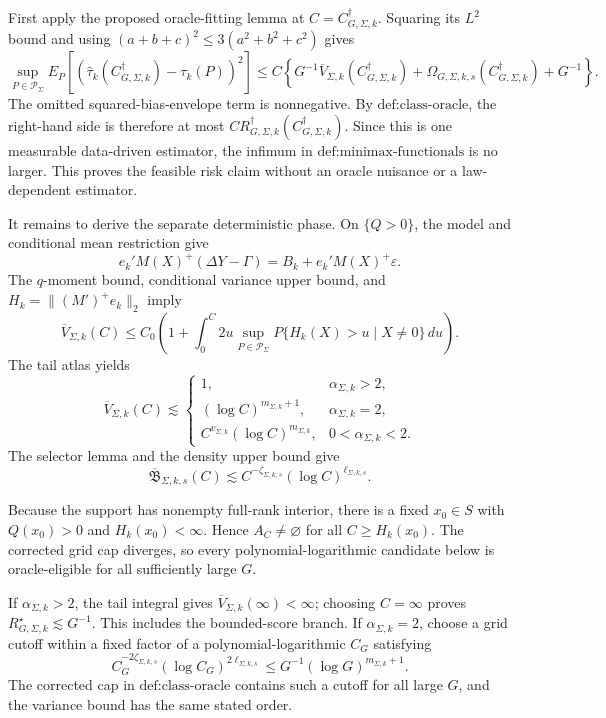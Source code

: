 First apply the proposed oracle-fitting lemma at \(C=C_{G,\Sigma,k}^{\dagger}\). Squaring its \(L^2\) bound and using \((a+b+c)^2\le3(a^2+b^2+c^2)\) gives
\[
\sup_{P\in\mathcal P_\Sigma}E_P[(\widehat\tau_k(C_{G,\Sigma,k}^{\dagger})-\tau_k(P))^2]
\le C\left\{G^{-1}\overline V_{\Sigma,k}(C_{G,\Sigma,k}^{\dagger})
+\Omega_{G,\Sigma,k,s}(C_{G,\Sigma,k}^{\dagger})+G^{-1}\right\}.
\]
The omitted squared-bias-envelope term is nonnegative. By \(\text{def:class-oracle}\), the right-hand side is therefore at most \(C R_{G,\Sigma,k}^{\dagger}(C_{G,\Sigma,k}^{\dagger})\). Since this is one measurable data-driven estimator, the infimum in \(\text{def:minimax-functionals}\) is no larger. This proves the feasible risk claim without an oracle nuisance or a law-dependent estimator.

It remains to derive the separate deterministic phase. On \(\{Q>0\}\), the model and conditional mean restriction give
\[
e_k'M(X)^+(\Delta Y-\Gamma)=B_k+e_k'M(X)^+\varepsilon.
\]
The \(q\)-moment bound, conditional variance upper bound, and \(H_k=\|(M')^+e_k\|_2\) imply
\[
\overline V_{\Sigma,k}(C)
\le C_0\left(1+\int_0^C2u\sup_{P\in\mathcal P_\Sigma}P\{H_k(X)>u\mid X\ne0\}\,du\right).
\]
The tail atlas yields
\[
\overline V_{\Sigma,k}(C)\lesssim
\begin{cases}
1,&\alpha_{\Sigma,k}>2,\\
(\log C)^{m_{\Sigma,k}+1},&\alpha_{\Sigma,k}=2,\\
C^{v_{\Sigma,k}}(\log C)^{m_{\Sigma,k}},&0<\alpha_{\Sigma,k}<2.
\end{cases}
\]
The selector lemma and the density upper bound give
\[
\overline{\mathfrak B}_{\Sigma,k,s}(C)
\lesssim C^{-\zeta_{\Sigma,k,s}}(\log C)^{\ell_{\Sigma,k,s}}.
\]

Because the support has nonempty full-rank interior, there is a fixed \(x_0\in S\) with \(Q(x_0)>0\) and \(H_k(x_0)<\infty\). Hence \(A_C\ne\varnothing\) for all \(C\ge H_k(x_0)\). The corrected grid cap diverges, so every polynomial-logarithmic candidate below is oracle-eligible for all sufficiently large \(G\).

If \(\alpha_{\Sigma,k}>2\), the tail integral gives \(\overline V_{\Sigma,k}(\infty)<\infty\); choosing \(C=\infty\) proves \(R_{G,\Sigma,k}^{\star}\lesssim G^{-1}\). This includes the bounded-score branch. If \(\alpha_{\Sigma,k}=2\), choose a grid cutoff within a fixed factor of a polynomial-logarithmic \(C_G\) satisfying
\[
C_G^{-2\zeta_{\Sigma,k,s}}(\log C_G)^{2\ell_{\Sigma,k,s}}
\le G^{-1}(\log G)^{m_{\Sigma,k}+1}.
\]
The corrected cap in \(\text{def:class-oracle}\) contains such a cutoff for all large \(G\), and the variance bound has the same stated order.


